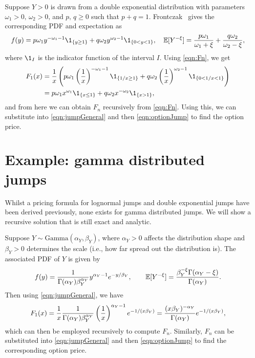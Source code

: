Suppose $Y > 0$ is drawn from a double exponential distribution with parameters $\omega_1 > 0, \, \omega_2 > 0$, and $p, \, q \geq 0$ such that $p + q = 1$. Frontczak~\cite{Frontczak2013} gives the corresponding PDF and expectation as
	\begin{equation*}
		f(y) = p\omega_1y^{-\omega_1-1}\1_{\{y\geq 1\}} + q\omega_2y^{\omega_2-1}\1_{\{0 < y < 1\}}, \quad \E[Y^{-\xi}] = \fr{p\omega_1}{\omega_1+\xi} + \fr{q\omega_2}{\omega_2-\xi},
	\end{equation*}
where $\1_{I}$ is the indicator function of the interval $I$. Using \eqref{eqn:Fn}, we get
	\begin{align}
		\label{eqn:doubleExp}
		\begin{split}
		F_1(x) &= \fr{1}{x}\left( p\omega_1\left(\fr{1}{x} \right)^{-\omega_1-1}\1_{\left\{ 1/x \geq 1 \right\}} + q\omega_2\left( \fr{1}{x} \right)^{\omega_2-1}\1_{\left\{ 0 < 1/x < 1 \right\}} \right) \\
		&= p\omega_1x^{\omega_1}\1_{\{ x \leq 1 \}} + q\omega_2x^{-\omega_2}\1_{\{x > 1\}},
		\end{split}
	\end{align}
and from here we can obtain $F_n$ recursively from \eqref{eqn:Fn}. Using this, we can substitute into \eqref{eqn:jumpGeneral} and then \eqref{eqn:optionJump} to find the option price.


\section{Example: gamma distributed jumps}
Whilst a pricing formula for lognormal jumps and double exponential jumps have been derived previously, none exists for gamma distributed jumps. We will show a recursive solution that is still exact and analytic.

Suppose $Y \sim \text{Gamma}(\alpha_Y,\beta_Y)$, where $\alpha_Y > 0$ affects the distribution shape and $\beta_Y > 0$ determines the scale (i.e., how far spread out the distribution is). The associated PDF of $Y$ is given by~\cite{Frontczak2013}
	\begin{equation*}
		f(y) = \frac{1}{\Gamma(\alpha_Y)\beta_Y^{\alpha_Y}}y^{\alpha_Y-1}e^{-y/\beta_Y}, \qquad \mathbb E[Y^{-\xi}] = \frac{\beta_Y^{-\xi}\Gamma(\alpha_Y-\xi)}{\Gamma(\alpha_Y)}.
	\end{equation*}
Then using \eqref{eqn:jumpGeneral}, we have
	\begin{equation}
		\label{eqn:gammaJump}
		F_1(x) = \frac{1}{x}\frac{1}{\Gamma(\alpha_Y)\beta_Y^{\alpha_Y}}\left(\frac{1}{x}\right)^{\alpha_Y-1}e^{-1/(x\beta_Y)} = \frac{(x\beta_Y)^{-\alpha_Y}}{\Gamma(\alpha_Y)}e^{-1/(x\beta_Y)},
	\end{equation}
which can then be employed recursively to compute $F_n$. Similarly, $F_n$ can be substituted into \eqref{eqn:jumpGeneral} and then \eqref{eqn:optionJump} to find the corresponding option price.

